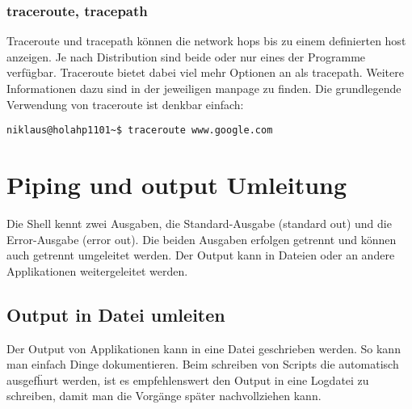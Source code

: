 \documentclass[10pt,paper=a4,final]{scrartcl}
\begin{document}
\subsubsection{traceroute, tracepath}
Traceroute und tracepath k\"onnen die network hops bis zu einem definierten host anzeigen. Je nach Distribution sind beide oder nur eines der Programme verf\"ugbar. Traceroute bietet dabei viel mehr Optionen an als tracepath. Weitere Informationen dazu sind in der jeweiligen manpage zu finden. Die grundlegende Verwendung von traceroute ist denkbar einfach:
\begin{lstlisting}[frame=single]
niklaus@holahp1101~$ traceroute www.google.com
\end{lstlisting}

\section{Piping und output Umleitung}
Die Shell kennt zwei Ausgaben, die Standard-Ausgabe (standard out) und die Error-Ausgabe (error out). Die beiden Ausgaben erfolgen getrennt und k\"onnen auch getrennt umgeleitet werden. Der Output kann in Dateien oder an andere Applikationen weitergeleitet werden.
\subsection{Output in Datei umleiten}
Der Output von Applikationen kann in eine Datei geschrieben werden. So kann man einfach Dinge dokumentieren. Beim schreiben von Scripts die automatisch ausgef\"hurt werden, ist es empfehlenswert den Output in eine Logdatei zu schreiben, damit man die Vorg\"ange sp\"ater nachvollziehen kann.
\end{document}
